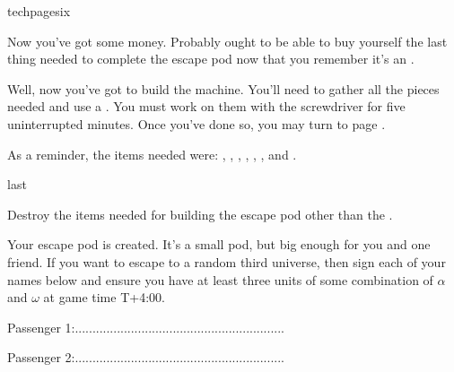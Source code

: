 \documentclass[greennotebook]{guildcamp3} %
\begin{document}
\begin{page}{techpagesix}
	
Now you've got some money. Probably ought to be able to buy yourself the last thing needed to complete the escape pod now that you remember it's an \iTransistor{}. 

Well, now you've got to build the machine. You'll need to gather all the pieces needed and use a \iScrewdriver{}. You must work on them with the screwdriver for five uninterrupted minutes. Once you've done so, you may turn to page . 

As a reminder, the items needed were: \iFishingNet{}, \iCircuitBoard{}, \iCog{}, \iGraphiteLube{}, \iFlashlight{}, \iNiobiumCarbide{}, and \iTransistor{}. 
	
\end{page}	


\begin{page}[at last...]{last}
	
Destroy the items needed for building the escape pod other than the \iScrewdriver{}.

Your escape pod is created. It's a small pod, but big enough for you and one friend. If you want to escape to a random third universe, then sign each of your names below and ensure you have at least three units of some combination of $\alpha$ and $\omega$ at game time T+4:00. 

Passenger 1:............................................................

Passenger 2:............................................................


\end{page}



\endnotebook
\end{document}
